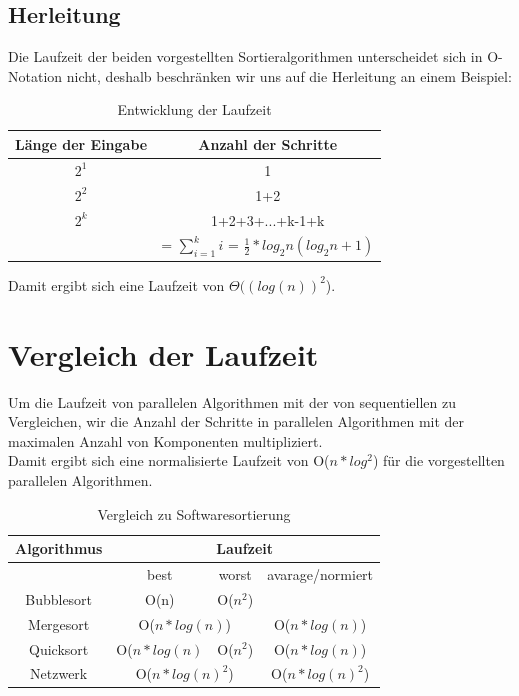 \documentclass[11pt,ngerman]{article}
\begin{document}
\subsection{Herleitung}
Die Laufzeit der beiden vorgestellten Sortieralgorithmen unterscheidet sich in O-Notation nicht, deshalb beschränken wir uns auf die Herleitung an einem Beispiel:\\
\begin{table}[!h]
\begin{center}
	\begin{tabular}{c | c}
		Länge der Eingabe & Anzahl der Schritte \\ \hline
		$2^1$ & 1 \\
		$2^2$ & 1+2 \\
		$2^k$ & 1+2+3+...+k-1+k \\
		& = $\sum_{i=1}^ki$ = $\frac{1}{2} * log_2n (log_2n +1) $
	\end{tabular}
\end{center}
\caption{Entwicklung der Laufzeit}
\end{table}
Damit ergibt sich eine Laufzeit von $\Theta((log(n))^2$). 
\section{Vergleich der Laufzeit}
Um die Laufzeit von parallelen Algorithmen mit der von sequentiellen zu Vergleichen, wir die Anzahl der Schritte in parallelen Algorithmen mit der maximalen Anzahl von Komponenten multipliziert.\\
Damit ergibt sich eine normalisierte Laufzeit von O($n*log^2$) für die vorgestellten parallelen Algorithmen.
\begin{table}[]
\begin{center}
	\begin{tabular}{c|c|c|c}
		Algorithmus & \multicolumn{3}{|c}{Laufzeit} \\ \hline
		& best & worst & avarage/normiert \\ \cline{2-4}
		Bubblesort & O(n) & O($n^2$) & \\
		Mergesort & \multicolumn{2}{|c|}{O($n * log(n)$)} & {O($n * log(n)$)} \\ 
		Quicksort & {O($n * log(n)$} & O($n^2$) & {O($n * log(n)$)} \\
		Netzwerk & \multicolumn{2}{|c|}{O($n * log(n)^2$)} & O($n * log(n)^2$) \\
	\end{tabular}
\end{center}
\caption{Vergleich zu Softwaresortierung}
\end{table}
\end{document}
